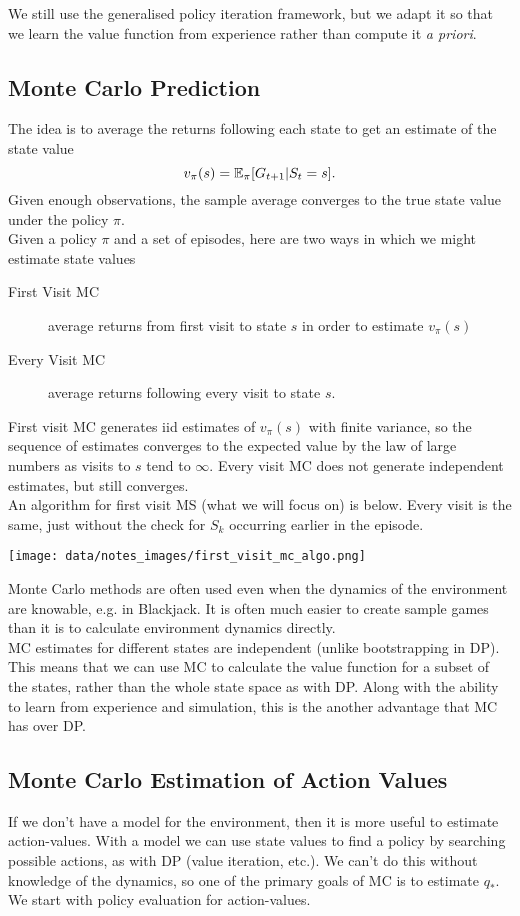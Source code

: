 We still use the generalised policy iteration framework, but we adapt it so that we learn the value function from experience rather than compute it \emph{a priori}.


\subsection{Monte Carlo Prediction}
The idea is to average the returns following each state to get an estimate of the state value
\[
    v_\pi(s) = \mathbb{E}_\pi{} [G_{t+1} | S_t =s].
\]
Given enough observations, the sample average converges to the true state value under the policy $\pi$.\\

Given a policy $\pi$ and a set of episodes, here are two ways in which we might estimate state values
\begin{description}
    \item[First Visit MC] average returns from first visit to state $s$ in order to estimate $v_\pi(s)$
    \item[Every Visit MC] average returns following every visit to state $s$.
\end{description}

First visit MC generates iid estimates of $v_\pi(s)$ with finite variance, so the sequence of estimates converges to the expected value by the law of large numbers as visits to $s$ tend to $\infty$. Every visit MC does not generate independent estimates, but still converges.\\

An algorithm for first visit MS (what we will focus on) is below. Every visit is the same, just without the check for $S_k$ occurring earlier in the episode.

\texttt{[image: data/notes\_images/first\_visit\_mc\_algo.png]}

Monte Carlo methods are often used even when the dynamics of the environment are knowable, e.g. in Blackjack. It is often much easier to create sample games than it is to calculate environment dynamics directly.\\

MC estimates for different states are independent (unlike bootstrapping in DP). This means that we can use MC to calculate the value function for a subset of the states, rather than the whole state space as with DP. Along with the ability to learn from experience and simulation, this is the another advantage that MC has over DP.

\subsection{Monte Carlo Estimation of Action Values}
If we don't have a model for the environment, then it is more useful to estimate action-values. With a model we can use state values to find a policy by searching possible actions, as with DP (value iteration, etc.). We can't do this without knowledge of the dynamics, so one of the primary goals of MC is to estimate $q_*$. We start with policy evaluation for action-values.

